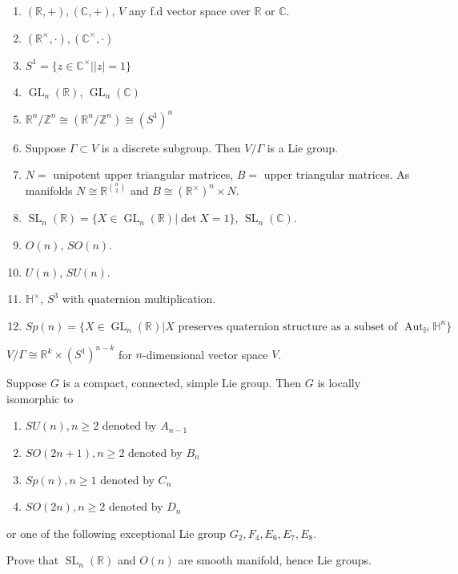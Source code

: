 \documentclass[12pt,a4paper]{article}
\theoremstyle{definition}
\theoremstyle{greenbox}
\newcommand{\R}{\mathbb{R}}
\newcommand{\Z}{\mathbb{Z}}
\newcommand{\C}{\mathbb{C}}
\newcommand{\Ho}{\mathbb{H}}
\begin{document}
    \begin{example}
        \begin{enumerate}
            \item $ \left( \R, + \right) , (\C, +)$, $ V $ any f.d vector space over $ \R $ or $ \C $. 
            \item $ (\R^{\times}, \cdot), (\C^{\times}, \cdot) $
            \item $ S^{1} = \{ z \in \C^{\times}| |z| =1\} $
            \item $ \operatorname{GL}_{n}(\R) $, $ \operatorname{GL}_{n}(\C) $
            \item $ \R^{n} / \Z^{n} \cong \left( \R^{n} /\Z^{n} \right) \cong (S^{1})^{n}$
            \item Suppose $ \Gamma \subset V $ is a discrete subgroup. Then $ V / \Gamma  $ is a Lie group.
            \item $ N = $ unipotent upper triangular matrices, $ B =  $ upper triangular matrices. As manifolds $ N \cong \R^{\binom{n}{2}} $ and $ B \cong (\R^{\times})^{n} \times N $.
            \item $ \operatorname{SL}_{n}(\R) = \{X \in \operatorname{GL}_{n}(\R) | \det X = 1\} $, $ \operatorname{SL}_{n}(\C) $. 
            \item $ O(n) $, $ SO(n) $.
            \item $ U(n) $, $ SU(n) $.
            \item $ \Ho^{\times} $, $ S^{3}  $ with quaternion multiplication.
            \item $ Sp(n) = \{X \in \operatorname{GL}_{n}(\R)| X \text{ preserves quaternion structure as a subset of } \operatorname{Aut}_{\Ho}\Ho^{n}\} $
        \end{enumerate}
    \end{example}
    \begin{problem}
        $ V / \Gamma  \cong \R^{k} \times  (S^{1})^{n-k}$ for $ n $-dimensional vector space $  V$. 
    \end{problem}
    \begin{thm}
        Suppose $ G $ is a compact, connected, simple Lie group. Then $ G $ is locally isomorphic to \begin{enumerate}
            \item $ SU(n) , n \ge 2$ denoted by $ A_{n-1} $
            \item $ SO(2n+1), n \ge 2 $ denoted by $ B_{n} $
            \item $ Sp(n), n \ge 1 $ denoted by $ C_{n} $
            \item $ SO(2n), n\ge 2 $ denoted by $ D_{n} $
        \end{enumerate}
        or one of the following exceptional Lie group $ G_{2}, F_{4}, E_{6}, E_{7}, E_{8} $.

    \end{thm}
    \begin{problem}
        Prove that $ \operatorname{SL}_{n}(\R) $ and $ O(n) $ are smooth manifold, hence Lie groups.
    \end{problem}
\end{document}
